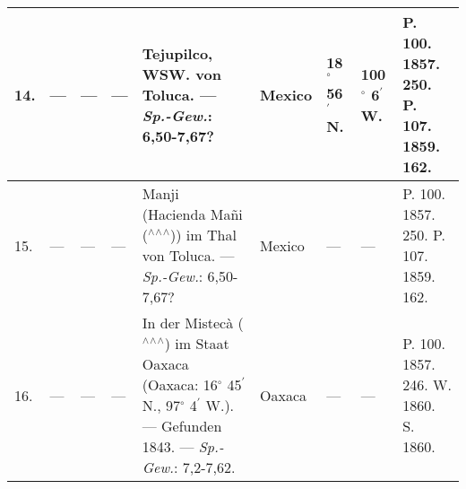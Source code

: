 \documentclass[a4paper, 8pt, oneside, polutonikogreek, german]{article}
\begin{document}
\begin{center}
\begin{longtable}{|p{3mm}|p{4mm}|p{11mm}|p{7mm}|p{22mm}|p{14mm}|p{10mm}|p{10mm}|p{13mm}|}
        14. & --- & --- & --- & Tejupilco, WSW. von Toluca. --- \emph{Sp.-Gew.}: 6,50-7,67? & Mexico & 18$^\circ$ 56$^\prime$ N. & 100$^\circ$ 6$^\prime$ W. & P. 100. 1857. 250. P. 107. 1859. 162. \\ \hline
        15. & --- & --- & --- & Manji (Hacienda Mañi ($^\wedge$$^\wedge$$^\wedge$)) im Thal von Toluca. --- \emph{Sp.-Gew.}: 6,50-7,67? & Mexico & --- & --- & P. 100. 1857. 250. P. 107. 1859. 162. \\ \hline
        16. & --- & --- & --- & In der Mistecà ($^\wedge$$^\wedge$$^\wedge$) im Staat Oaxaca (Oaxaca: 16$^\circ$ 45$^\prime$ N., 97$^\circ$ 4$^\prime$ W.). --- Gefunden 1843. --- \emph{Sp.-Gew.}: 7,2-7,62. & Oaxaca & --- & --- & P. 100. 1857. 246. W. 1860. S. 1860. \\ \hline
    \end{longtable}
\end{center}
\end{document}
